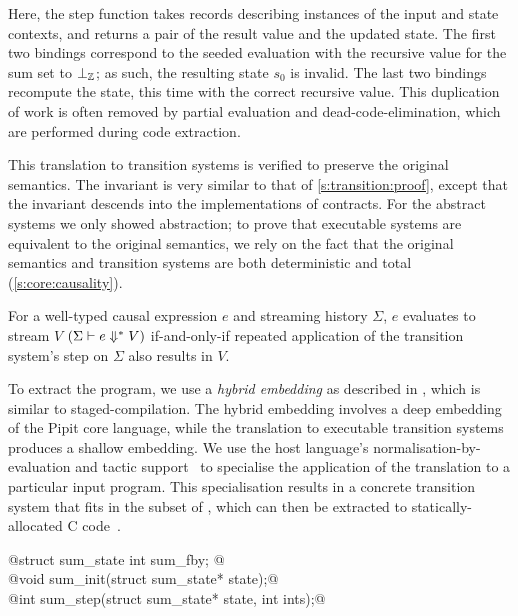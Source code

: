 Here, the step function takes records describing instances of the input and state contexts, and returns a pair of the result value and the updated state.
The first two bindings correspond to the seeded evaluation with the recursive value for the sum set to $\bot_{\mathbb{Z}}$; as such, the resulting state $s_0$ is invalid.
The last two bindings recompute the state, this time with the correct recursive value.
This duplication of work is often removed by partial evaluation and dead-code-elimination, which are performed during code extraction.

This translation to transition systems is verified to preserve the original semantics.
The invariant is very similar to that of \autoref{s:transition:proof}, except that the invariant descends into the implementations of contracts.
For the abstract systems we only showed abstraction; to prove that executable systems are equivalent to the original semantics, we rely on the fact that the original semantics and transition systems are both deterministic and total (\autoref{s:core:causality}).

\begin{theorem}
  For a well-typed causal expression $e$ and streaming history $\Sigma$, $e$ evaluates to stream $V$ $(\Sigma \vdash e \Downarrow^{*} V)$ if-and-only-if repeated application of the transition system's step on $\Sigma$ also results in $V$.
\end{theorem}

To extract the program, we use a \emph{hybrid embedding} as described in \cite{ho2022noise}, which is similar to staged-compilation.
The hybrid embedding involves a deep embedding of the Pipit core language, while the translation to executable transition systems produces a shallow embedding.
We use the \fstar{} host language's normalisation-by-evaluation and tactic support~\cite{martinez2019meta} to specialise the application of the translation to a particular input program.
This specialisation results in a concrete transition system that fits in the \lowstar{} subset of \fstar{}, which can then be extracted to statically-allocated C code~\cite{protzenko2017verified}.


  \begin{tabbing}
    @struct sum_state { int sum_fby; }@ \\
    @void   sum_init(struct sum_state* state);@ \\
    @int    sum_step(struct sum_state* state, int ints);@\\
  \end{tabbing}

